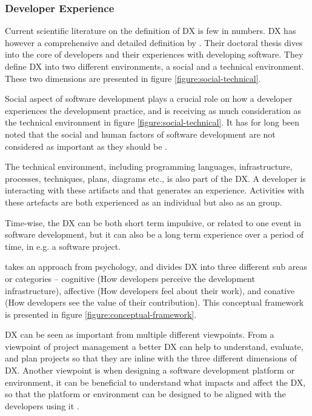 \documentclass[english, 12pt, a4paper, sci, utf8, a-1b, online]{aaltothesis}
\begin{document}

\subsubsection{Developer Experience}

Current scientific literature on the definition of DX is few in numbers. DX has however a comprehensive and detailed definition by \cite{fagerholm-doctoral-thesis}. Their doctoral thesis dives into the core of developers and their experiences with developing software. They define DX into two different environments, a social and a technical environment. These two dimensions are presented in figure \ref{figure:social-technical}.

Social aspect of software development plays a crucial role on how a developer experiences the development practice, and is receiving as much consideration as the technical environment in figure \ref{figure:social-technical}. It has for long been noted that the social and human factors of software development are not considered as important as they should be \citep{human-factor}.

The technical environment, including programming languages, infrastructure, processes, techniques, plans, diagrams etc., is also part of the DX. A developer is interacting with these artifacts and that generates an experience. Activities with these artefacts are both experienced as an individual but also as an group.

Time-wise, the DX can be both short term impulsive, or related to one event in software development, but it can also be a long term experience over a period of time, in e.g. a software project.

\cite{fagerholm-dx-concept-and-definition} takes an approach from psychology, and divides DX into three different sub areas or categories – cognitive (How developers perceive the development infrastructure), affective (How developers feel about their work), and conative (How developers see the value of their contribution). This conceptual framework is presented in figure \ref{figure:conceptual-framework}.

DX can be seen as important from multiple different viewpoints. From a viewpoint of project management a better DX can help to understand, evaluate, and plan projects so that they are inline with the three different dimensions of DX. Another viewpoint is when designing a software development platform or environment, it can be beneficial to understand what impacts and affect the DX, so that the platform or environment can be designed to be aligned with the developers using it \cite{fagerholm-dx-concept-and-definition}.
\end{document}
